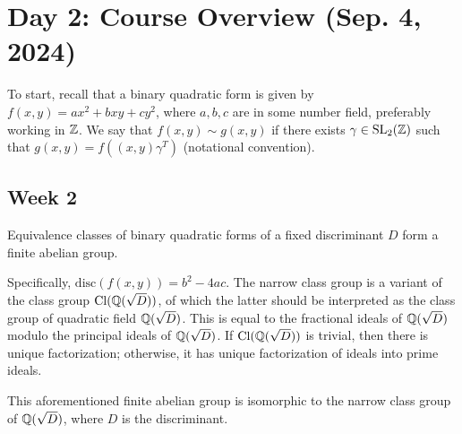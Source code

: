 \section{Day 2: Course Overview (Sep. 4, 2024)}
To start, recall that a binary quadratic form is given by $f(x, y) = ax^2 + bxy + cy^2$, where $a, b, c$ are in some number field, preferably working in $\mathbb Z$. We say that $f(x, y) \sim g(x, y)$ if there exists $\gamma \in \operatorname{SL}_2(\mathbb Z)$ such that $g(x, y) = f((x, y) \gamma^T)$ (notational convention).

\subsection{Week 2}
\begin{simplethm}[Gauss]
    Equivalence classes of binary quadratic forms of a fixed discriminant $D$ form a finite abelian group.
\end{simplethm}
\noindent Specifically, $\mathrm{disc}(f(x, y)) = b^2 - 4ac$. The narrow class group is a variant of the class group $\mathrm{Cl}(\mathbb Q(\sqrt{D}))$, of which the latter should be interpreted as the class group of quadratic field $\mathbb Q(\sqrt{D})$. This is equal to the fractional ideals of $\mathbb Q(\sqrt D)$ modulo the principal ideals of $\mathbb Q(\sqrt D)$. If $\mathrm{Cl}(\mathbb Q(\sqrt{D}))$ is trivial, then there is unique factorization; otherwise, it has unique factorization of ideals into prime ideals.

\begin{simplethm}
    This aforementioned finite abelian group is isomorphic to the narrow class group of $\mathbb Q(\sqrt D)$, where $D$ is the discriminant.
\end{simplethm}

